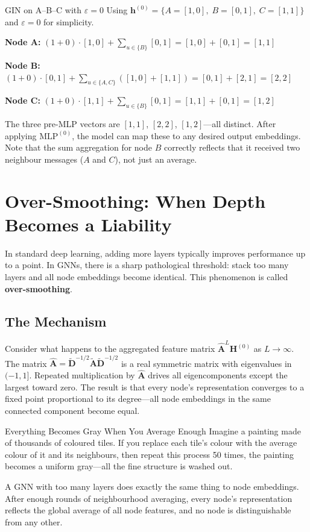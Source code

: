 \begin{examplebox}{GIN on A--B--C with $\varepsilon = 0$}
Using $\mathbf{h}^{(0)} = \{A=[1,0],\; B=[0,1],\; C=[1,1]\}$ and $\varepsilon = 0$ for simplicity.

\textbf{Node A:}
$(1+0)\cdot[1,0] + \sum_{u \in \{B\}} [0,1] = [1,0] + [0,1] = [1,1]$

\textbf{Node B:}
$(1+0)\cdot[0,1] + \sum_{u \in \{A,C\}} ([1,0]+[1,1]) = [0,1] + [2,1] = [2,2]$

\textbf{Node C:}
$(1+0)\cdot[1,1] + \sum_{u \in \{B\}} [0,1] = [1,1] + [0,1] = [1,2]$

The three pre-MLP vectors are $[1,1]$, $[2,2]$, $[1,2]$---all distinct. After applying $\text{MLP}^{(0)}$, the model can map these to any desired output embeddings. Note that the sum aggregation for node $B$ correctly reflects that it received two neighbour messages ($A$ and $C$), not just an average.
\end{examplebox}

\section{Over-Smoothing: When Depth Becomes a Liability}

In standard deep learning, adding more layers typically improves performance up to a point. In GNNs, there is a sharp pathological threshold: stack too many layers and all node embeddings become identical. This phenomenon is called \textbf{over-smoothing}.

\subsection{The Mechanism}

Consider what happens to the aggregated feature matrix $\hat{\mathbf{A}}^L \mathbf{H}^{(0)}$ as $L \to \infty$. The matrix $\hat{\mathbf{A}} = \tilde{\mathbf{D}}^{-1/2} \tilde{\mathbf{A}} \tilde{\mathbf{D}}^{-1/2}$ is a real symmetric matrix with eigenvalues in $(-1, 1]$. Repeated multiplication by $\hat{\mathbf{A}}$ drives all eigencomponents except the largest toward zero. The result is that every node's representation converges to a fixed point proportional to its degree---all node embeddings in the same connected component become equal.

\begin{analogybox}{Everything Becomes Gray When You Average Enough}
Imagine a painting made of thousands of coloured tiles. If you replace each tile's colour with the average colour of it and its neighbours, then repeat this process 50 times, the painting becomes a uniform gray---all the fine structure is washed out.

A GNN with too many layers does exactly the same thing to node embeddings. After enough rounds of neighbourhood averaging, every node's representation reflects the global average of all node features, and no node is distinguishable from any other.
\end{analogybox}

